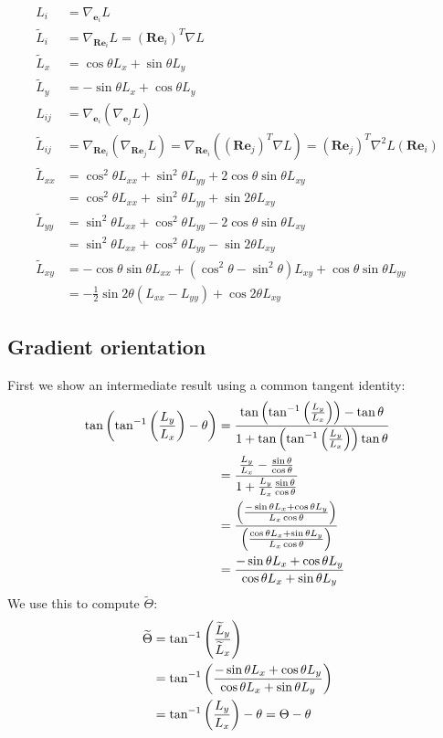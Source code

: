 \documentclass[thesis.tex]{subfiles}
\begin{document}
\begin{align*}
L_i &= \nabla_{\mathbf{e}_i} L \\
\widetilde{L}_i &= \nabla_{\mathbf{Re}_i} L = (\mathbf{Re}_i)^T \nabla L \\
\widetilde{L}_x &= \cos \theta L_x + \sin \theta L_y \\
\widetilde{L}_y &= -\sin \theta L_x + \cos \theta L_y \\
L_{ij} &= \nabla_{\mathbf{e}_i} (\nabla_{\mathbf{e}_j} L) \\
\widetilde{L}_{ij} &= \nabla_{\mathbf{Re}_i} (\nabla_{\mathbf{Re}_j} L)
= \nabla_{\mathbf{Re}_i} \left( (\mathbf{Re}_j)^T \nabla L \right)
= (\mathbf{Re}_j)^T \nabla^2 L (\mathbf{Re}_i) \\
\widetilde{L}_{xx} &= \cos^2 \theta L_{xx} + \sin^2 \theta L_{yy} + 2 \cos \theta \sin \theta L_{xy} \\
&= \cos^2 \theta L_{xx} + \sin^2 \theta L_{yy} + \sin 2\theta L_{xy} \\
\widetilde{L}_{yy} &= \sin^2 \theta L_{xx} + \cos^2 \theta L_{yy} - 2 \cos \theta \sin \theta L_{xy} \\
&= \sin^2 \theta L_{xx} + \cos^2 \theta L_{yy} - \sin 2\theta L_{xy} \\
\widetilde{L}_{xy} &= -\cos \theta \sin \theta L_{xx} + (\cos^2 \theta - \sin^2 \theta) L_{xy} + \cos \theta \sin \theta L_{yy} \\
&= -\frac12 \sin 2\theta (L_{xx} - L_{yy}) + \cos 2\theta L_{xy}
\end{align*}
%
\subsection{Gradient orientation} \label{apx:rotation_go}
%
First we show an intermediate result using a common tangent identity:
%
\begin{align*}
\tan \left( \tan^{-1} \left( \frac{L_y}{L_x} \right) - \theta \right)
&= \frac{\tan \left( \tan^{-1} \left( \frac{L_y}{L_x} \right) \right) - \tan \theta}{1 + \tan \left( \tan^{-1} \left( \frac{L_y}{L_x} \right) \right) \tan \theta} \\
&= \frac{\frac{L_y}{L_x} - \frac{\sin \theta}{\cos \theta}}{1 + \frac{L_y}{L_x} \frac{\sin \theta}{\cos \theta}} \\
&= \frac{\left(\frac{-\sin \theta L_x + \cos \theta L_y}{L_x \cos \theta}\right)}{\left(\frac{\cos \theta L_x + \sin \theta L_y}{L_x \cos \theta}\right)} \\
&= \frac{-\sin \theta L_x + \cos \theta L_y}{\cos \theta L_x + \sin \theta L_y}
\end{align*}
%
We use this to compute $\widetilde{\Theta}$:
%
\begin{align*}
\widetilde{\Theta} &= \tan^{-1} \left( \frac{\widetilde{L}_y}{\widetilde{L}_x} \right) \\
&= \tan^{-1} \left( \frac{-\sin \theta L_x + \cos \theta L_y}{\cos \theta L_x + \sin \theta L_y} \right) \\
&= \tan^{-1} \left( \frac{L_y}{L_x} \right) - \theta = \Theta - \theta
\end{align*}
%
\end{document}

